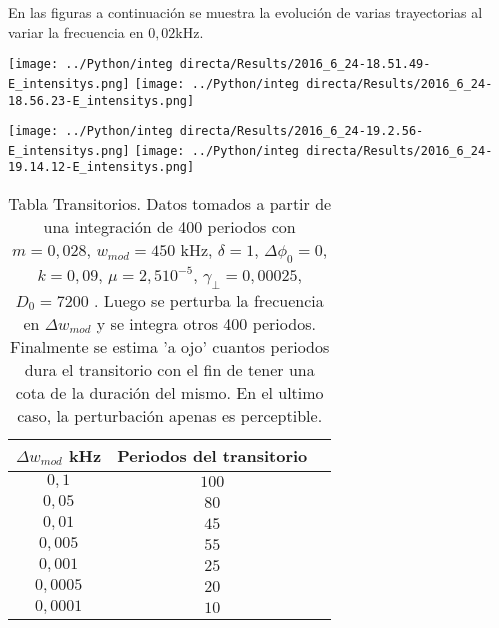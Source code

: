 	En las figuras a continuación se muestra la evolución de varias trayectorias al variar la frecuencia en $0,02$kHz.
	
		\begin{minipage}{0.5\textwidth}
			
			\centering
			\texttt{[image: ../Python/integ directa/Results/2016\_6\_24-18.51.49-E\_intensitys.png]}
			\texttt{[image: ../Python/integ directa/Results/2016\_6\_24-18.56.23-E\_intensitys.png]}
			
		\end{minipage}
		\begin{minipage}{0.5\textwidth}
			
			\centering
			\texttt{[image: ../Python/integ directa/Results/2016\_6\_24-19.2.56-E\_intensitys.png]}
			\texttt{[image: ../Python/integ directa/Results/2016\_6\_24-19.14.12-E\_intensitys.png]}
			
		\end{minipage}		
		\begin{center}
			\begin{table}[h]
				\begin{tabular}{|c|c|c|}
					\hline
					$\Delta w_{mod}$ kHz  & Periodos del transitorio \Ts \Bs   \\ \hline
					$0,1$		  &        		$100$					  \\ \hline
					$0,05$		  &        		$80$					  \\ \hline		
			  $0,01$        &        		$45$					  \\ \hline					
					$0,005$       &        		$55$					  \\ \hline		
					$0,001$       &        		$25$					  \\ \hline
					$0,0005$      &        		$20$				  	  \\ \hline
	   				$0,0001$      &        		$10$				     \\	\hline 						  
					
				\end{tabular}
				\caption{Tabla Transitorios. Datos tomados a partir de una integración de 400 periodos con $m=0,028$, $w_{mod}=450$ kHz, $\delta=1$, $\Delta \phi_0=0$, $k=0,09$, $\mu=2,5 10^{-5}$, $\gamma_{\bot}=0,00025$, $D_0=7200$ . Luego se perturba la frecuencia en $\Delta w_{mod}$ y se integra otros 400 periodos. Finalmente se estima 'a ojo' cuantos periodos dura el transitorio con el fin de tener una cota de la duración del mismo.
					En el ultimo caso, la perturbación apenas es perceptible.
				}
				\label{tab: trans one field}
			\end{table}
		\end{center}
	
